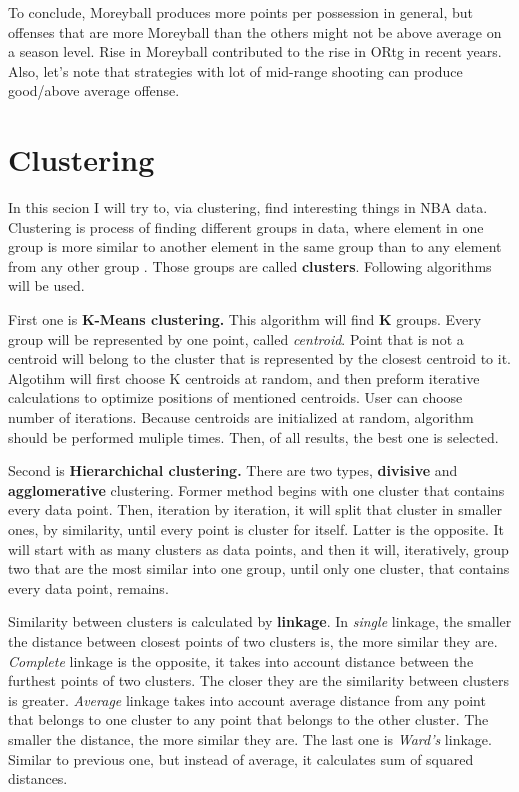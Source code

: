 \documentclass[a4paper]{article}
\begin{document}
To conclude, Moreyball produces more points per possession in general, but offenses that are more Moreyball than the others might not be above average on a season level. Rise in Moreyball contributed to the rise in ORtg in recent years. Also, let's note that strategies with lot of mid-range shooting can produce good/above average offense. %


\section{Clustering}
\label{sec:clustering}

In this secion I will try to, via clustering, find interesting things in NBA data. Clustering is process of finding different groups in data, where element in one group is more similar to another element in the same group than to any element from any other group \cite{clustering}. Those groups are called \textbf{clusters}. Following algorithms will be used.

First one is \textbf{K-Means clustering.} This algorithm will find \textbf{K} groups. Every group will be represented by one point, called \textit{centroid}. Point that is not a centroid will belong to the cluster that is represented by the closest centroid to it. Algotihm will first choose K centroids at random, and then preform iterative calculations to optimize positions of mentioned centroids. User can choose number of iterations. Because centroids are initialized at random, algorithm should be performed muliple times. Then, of all results, the best one is selected. \cite{clustering}

Second is \textbf{Hierarchichal clustering.} There are two types, \textbf{divisive} and \textbf{agglomerative} clustering. Former method begins with one cluster that contains every data point. Then, iteration by iteration, it will split that cluster in smaller ones, by similarity, until every point is cluster for itself. Latter is the opposite. It will start with as many clusters as data points, and then it will, iteratively, group two that are the most similar into one group, until only one cluster, that contains every data point, remains. \cite{clustering}

Similarity between clusters is calculated by \textbf{linkage}. In \textit{single} linkage, the smaller the distance between closest points of two clusters is, the more similar they are. \textit{Complete} linkage is the opposite, it takes into account distance between the furthest points of two clusters. The closer they are the similarity between clusters is greater. \textit{Average} linkage takes into account average distance from any point that belongs to one cluster to any point that belongs to the other cluster. The smaller the distance, the more similar they are. The last one is \textit{Ward's} linkage. Similar to previous one, but instead of average, it calculates sum of squared distances. \cite{clustering}\cite{hierarchical}
\end{document}
